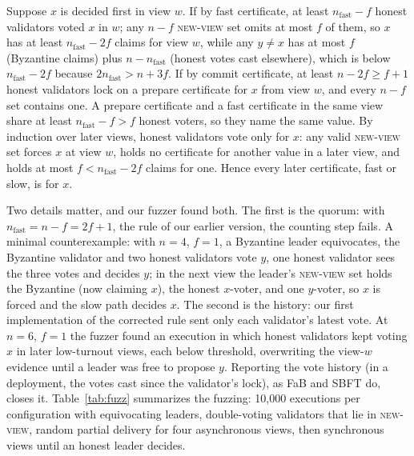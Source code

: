 \documentclass[journal]{IEEEtran}
\newcommand{\nf}{\ensuremath{n_{\mathrm{fast}}}}
\begin{document}
\begin{IEEEproof}
Suppose $x$ is decided first in view $w$. If by fast certificate, at
least $\nf - f$ honest validators voted $x$ in $w$; any $n - f$
\textsc{new-view} set omits at most $f$ of them, so $x$ has at least
$\nf - 2f$ claims for view $w$, while any $y \ne x$ has at most $f$
(Byzantine claims) plus $n - \nf$ (honest votes cast elsewhere), which is
below $\nf - 2f$ because $2\nf > n + 3f$. If by commit certificate, at
least $n - 2f \ge f + 1$ honest validators lock on a prepare certificate
for $x$ from view $w$, and every $n - f$ set contains one. A prepare
certificate and a fast certificate in the same view share at least
$\nf - f > f$ honest voters, so they name the same value. By induction
over later views, honest validators vote only for $x$: any valid
\textsc{new-view} set forces $x$ at view $w$, holds no certificate for
another value in a later view, and holds at most $f < \nf - 2f$ claims
for one. Hence every later certificate, fast or slow, is for $x$.
\end{IEEEproof}

Two details matter, and our fuzzer found both. The first is the quorum:
with $\nf = n - f = 2f + 1$, the rule of our earlier version, the
counting step fails. A minimal counterexample: with $n = 4$,
$f = 1$, a Byzantine leader equivocates, the Byzantine validator and two
honest validators vote $y$, one honest validator sees the three votes
and decides $y$; in the next view the leader's \textsc{new-view} set
holds the Byzantine (now claiming $x$), the honest $x$-voter, and one
$y$-voter, so $x$ is forced and the slow path decides $x$. The second is
the history: our first implementation of the corrected rule sent only
each validator's latest vote. At $n = 6$, $f = 1$ the fuzzer found an
execution in which honest validators kept voting $x$ in later
low-turnout views, each below threshold, overwriting the view-$w$
evidence until a leader was free to propose $y$. Reporting the vote
history (in a deployment, the votes cast since the validator's lock), as
FaB and SBFT do, closes it. Table~\ref{tab:fuzz} summarizes the fuzzing:
10,000 executions per configuration with equivocating leaders,
double-voting validators that lie in \textsc{new-view}, random partial
delivery for four asynchronous views, then synchronous views until an
honest leader decides.
\end{document}
